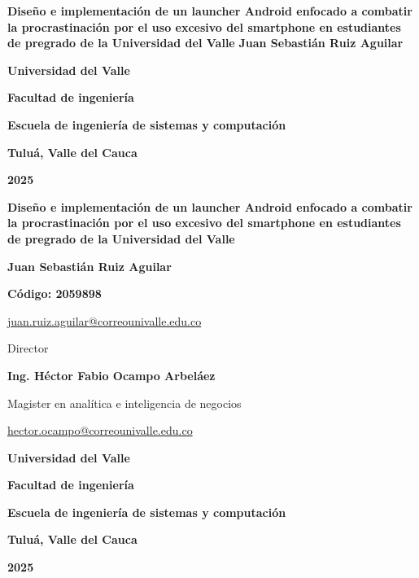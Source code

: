 \newcommand\portada{
\begin{titlepage}
		\begin{center}
			{\bf Diseño e implementación de un launcher Android enfocado a combatir la procrastinación por el uso excesivo del smartphone en estudiantes de pregrado de la Universidad del Valle}
			\vfill
			{\bf Juan Sebastián Ruiz Aguilar}
			\vfill
			{\bf Universidad del Valle\par}
			{\bf Facultad de ingeniería \par}
			{\bf Escuela de ingeniería de sistemas y computación \par}
			{\bf Tuluá, Valle del Cauca \par}
			{\bf 2025 \par}
		\end{center}
\end{titlepage}
}

\newcommand\contraportada{
	\begin{titlepage}
		\begin{center}
			{\bf Diseño e implementación de un launcher Android enfocado a combatir la procrastinación por el uso excesivo del smartphone en estudiantes de pregrado de la Universidad del Valle}
			\vfill
			\vfill
			\vfill
			{\bf Juan Sebastián Ruiz Aguilar \par}
			{\bf Código: 2059898 \par}
			{\url{juan.ruiz.aguilar@correounivalle.edu.co} \par}
			\vfill
			\vfill
			\vfill
			\vfill
			{Director \par}
			{\bf Ing. Héctor Fabio Ocampo Arbeláez \par}
			{Magister en analítica e inteligencia de negocios \par}
			{\url{hector.ocampo@correounivalle.edu.co} \par}
			\vfill
			\vfill
			\vfill
			{\bf Universidad del Valle\par}
			{\bf Facultad de ingeniería \par}
			{\bf Escuela de ingeniería de sistemas y computación \par}
			{\bf Tuluá, Valle del Cauca \par}
			{\bf 2025 \par}
		\end{center}
\end{titlepage}
}

\portada
\contraportada